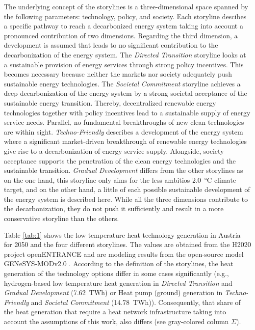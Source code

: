 The underlying concept of the storylines is a three-dimensional space spanned by the following parameters: technology, policy, and society. Each storyline descibes a specific pathway to reach a decarbonized energy system taking into account a pronounced contribution of two dimensions. Regarding the third dimension, a development is assumed that leads to no significant contribution to the decarbonization of the energy system. The \textit{Directed Transition} storyline looks at a sustainable provision of energy services through strong policy incentives. This becomes necessary because neither the markets nor society adequately push sustainable energy technologies. The \textit{Societal Commitment} storyline achieves a deep decarbonization of the energy system by a strong societal acceptance of the sustainable energy transition. Thereby, decentralized renewable energy technologies together with policy incentives lead to a sustainable supply of energy service needs. Parallel, no fundamental breakthroughs of new clean technologies are within sight. \textit{Techno-Friendly} describes a development of the energy system where a significant market-driven breakthrough of renewable energy technologies give rise to a decarbonization of energy service supply. Alongside, society acceptance supports the penetration of the clean energy technologies and the sustainable transition. \textit{Gradual Development} differs from the other storylines as on the one hand, this storyline only aims for the less ambitios \SI{2.0}{\degreeCelsius} climate target, and on the other hand, a little of each possible sustainable development of the energy system is described here. While all the three dimensions contribute to the decarbonization, they do not push it sufficiently and result in a more conservative storyline than the others.\newline

Table \ref{tab:1} shows the low temperature heat technology generation in Austria for \SI{2050}{} and the four different storylines. The values are obtained from the H2020 project openENTRANCE and are modeling results from the open-source model GENeSYS-MODv2.0 \cite{burandt2018genesys}. According to the definition of the storylines, the heat generation of the technology options differ in some cases significantly (e.g., hydrogen-based low temperature heat generation in \textit{Directed Transition} and \textit{Gradual Development} (\SI{+7.62}{TWh}) or Heat pump (ground) generation in \textit{Techno-Friendly} and \textit{Societal Commitment} (\SI{14.78}{TWh})). Consequently, that share of the heat generation that require a heat network infrastructure taking into account the assumptions of this work, also differs (see gray-colored column $\Sigma$).

